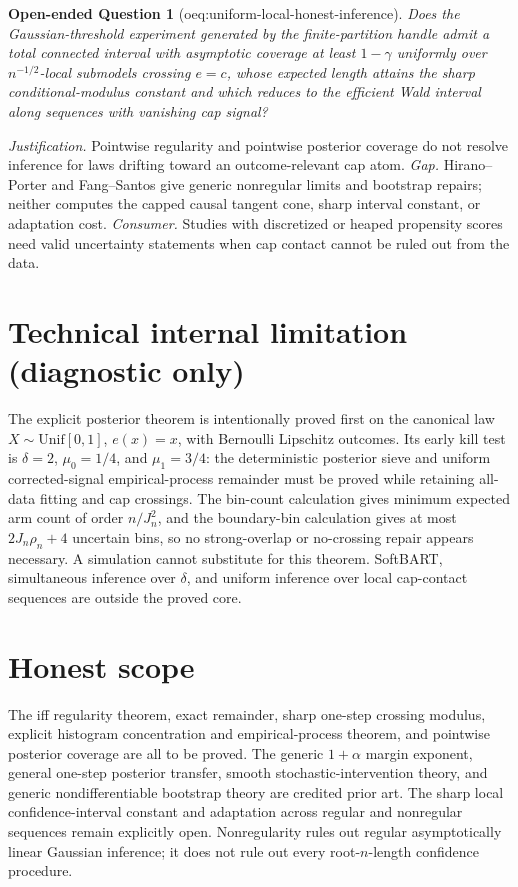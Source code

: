 \documentclass{article}
\newtheorem{openendedquestion}{Open-ended Question}
\begin{document}
\begin{openendedquestion}[oeq:uniform-local-honest-inference]\label{oeq:uniform-local-honest-inference}
Does the Gaussian-threshold experiment generated by the finite-partition handle admit a total connected interval with asymptotic coverage at least \(1-\gamma\) uniformly over \(n^{-1/2}\)-local submodels crossing \(e=c\), whose expected length attains the sharp conditional-modulus constant and which reduces to the efficient Wald interval along sequences with vanishing cap signal?
\end{openendedquestion}
\par\smallskip\noindent \textit{Justification.} Pointwise regularity and pointwise posterior coverage do not resolve inference for laws drifting toward an outcome-relevant cap atom. \textit{Gap.} Hirano--Porter and Fang--Santos give generic nonregular limits and bootstrap repairs; neither computes the capped causal tangent cone, sharp interval constant, or adaptation cost. \textit{Consumer.} Studies with discretized or heaped propensity scores need valid uncertainty statements when cap contact cannot be ruled out from the data.

\section*{Technical internal limitation (diagnostic only)}

The explicit posterior theorem is intentionally proved first on the canonical law \(X\sim\mathrm{Unif}[0,1]\), \(e(x)=x\), with Bernoulli Lipschitz outcomes. Its early kill test is \(\delta=2\), \(\mu_0=1/4\), and \(\mu_1=3/4\): the deterministic posterior sieve and uniform corrected-signal empirical-process remainder must be proved while retaining all-data fitting and cap crossings. The bin-count calculation gives minimum expected arm count of order \(n/J_n^2\), and the boundary-bin calculation gives at most \(2J_n\rho_n+4\) uncertain bins, so no strong-overlap or no-crossing repair appears necessary. A simulation cannot substitute for this theorem. SoftBART, simultaneous inference over \(\delta\), and uniform inference over local cap-contact sequences are outside the proved core.

\section{Honest scope}

The iff regularity theorem, exact remainder, sharp one-step crossing modulus, explicit histogram concentration and empirical-process theorem, and pointwise posterior coverage are all to be proved. The generic \(1+\alpha\) margin exponent, general one-step posterior transfer, smooth stochastic-intervention theory, and generic nondifferentiable bootstrap theory are credited prior art. The sharp local confidence-interval constant and adaptation across regular and nonregular sequences remain explicitly open. Nonregularity rules out regular asymptotically linear Gaussian inference; it does not rule out every root-\(n\)-length confidence procedure.
\end{document}
